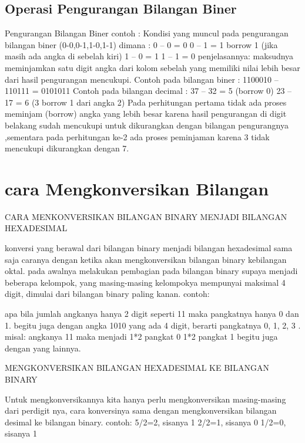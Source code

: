 \subsection {Operasi Pengurangan Bilangan Biner}	
	Pengurangan Bilangan Biner
	contoh :
Kondisi yang muncul pada pengurangan bilangan biner (0-0,0-1,1-0,1-1) dimana :
0 – 0 = 0
0 – 1 = 1 borrow 1 (jika masih ada angka di sebelah kiri)
1 – 0 = 1
1 – 1 = 0
penjelasannya: maksudnya meminjamkan satu digit angka dari kolom sebelah yang memiliki nilai lebih besar dari hasil pengurangan mencukupi.
Contoh pada bilangan biner :
1100010 – 110111 = 0101011 
Contoh pada bilangan decimal :
37 – 32 = 5 (borrow 0)
23 – 17 = 6 (3 borrow 1 dari angka 2)
Pada perhitungan pertama tidak ada proses meminjam (borrow) angka yang lebih besar karena hasil pengurangan di digit belakang sudah mencukupi untuk dikurangkan dengan bilangan pengurangnya ,sementara pada perhitungan ke-2 ada proses peminjaman karena 3 tidak mencukupi dikurangkan dengan 7.


\section {cara Mengkonversikan Bilangan}
 CARA MENKONVERSIKAN BILANGAN BINARY MENJADI BILANGAN HEXADESIMAL
 
 konversi yang berawal dari bilangan binary menjadi bilangan hexadesimal sama saja caranya dengan ketika akan mengkonversikan bilangan binary kebilangan oktal. pada awalnya melakukan pembagian pada bilangan binary supaya menjadi beberapa kelompok, yang masing-masing kelompokya mempunyai maksimal 4 digit, dimulai dari bilangan binary paling kanan.
contoh:
 
apa bila jumlah angkanya hanya 2 digit seperti 11 maka pangkatnya hanya 0 dan 1. begitu juga dengan angka 1010 yang ada 4 digit, berarti pangkatnya 0, 1, 2, 3 . 
misal: angkanya 11 maka menjadi
		1*2 pangkat 0
		1*2 pangkat 1
		begitu juga dengan yang lainnya.


MENGKONVERSIKAN BILANGAN HEXADESIMAL KE BILANGAN BINARY

Untuk mengkonversikannya kita hanya perlu mengkonversikan masing-masing dari perdigit nya, cara konversinya sama dengan mengkonversikan bilangan desimal ke bilangan binary.
contoh: 
	5/2=2, sisanya 1
	2/2=1, sisanya 0
	1/2=0, sisanya 1
	

